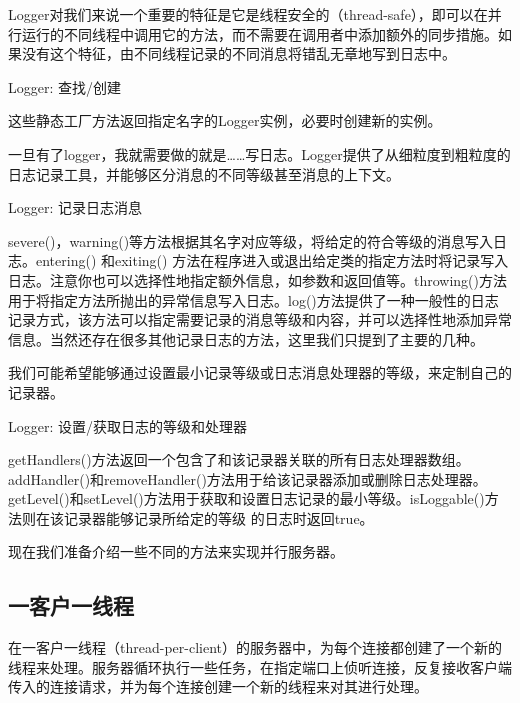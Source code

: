 		Logger对我们来说一个重要的特征是它是线程安全的（thread-safe），即可以在并行运行的不同线程中调用它的方法，而不需要在调用者中添加额外的同步措施。如果没有这个特征，由不同线程记录的不同消息将错乱无章地写到日志中。 

		Logger: 查找/创建 

		

		这些静态工厂方法返回指定名字的Logger实例，必要时创建新的实例。 

		一旦有了logger，我就需要做的就是……写日志。Logger提供了从细粒度到粗粒度的日志记录工具，并能够区分消息的不同等级甚至消息的上下文。 

		Logger: 记录日志消息 

		

		severe()，warning()等方法根据其名字对应等级，将给定的符合等级的消息写入日志。entering() 和exiting() 方法在程序进入或退出给定类的指定方法时将记录写入日志。注意你也可以选择性地指定额外信息，如参数和返回值等。throwing()方法用于将指定方法所抛出的异常信息写入日志。log()方法提供了一种一般性的日志记录方式，该方法可以指定需要记录的消息等级和内容，并可以选择性地添加异常信息。当然还存在很多其他记录日志的方法，这里我们只提到了主要的几种。 

		我们可能希望能够通过设置最小记录等级或日志消息处理器的等级，来定制自己的记录器。 

		Logger: 设置/获取日志的等级和处理器 

		

		getHandlers()方法返回一个包含了和该记录器关联的所有日志处理器数组。addHandler()和removeHandler()方法用于给该记录器添加或删除日志处理器。getLevel()和setLevel()方法用于获取和设置日志记录的最小等级。isLoggable()方法则在该记录器能够记录所给定的等级 的日志时返回true。 

		现在我们准备介绍一些不同的方法来实现并行服务器。 

	\subsection{一客户一线程} 

		在一客户一线程（thread-per-client）的服务器中，为每个连接都创建了一个新的线程来处理。服务器循环执行一些任务，在指定端口上侦听连接，反复接收客户端传入的连接请求，并为每个连接创建一个新的线程来对其进行处理。 

